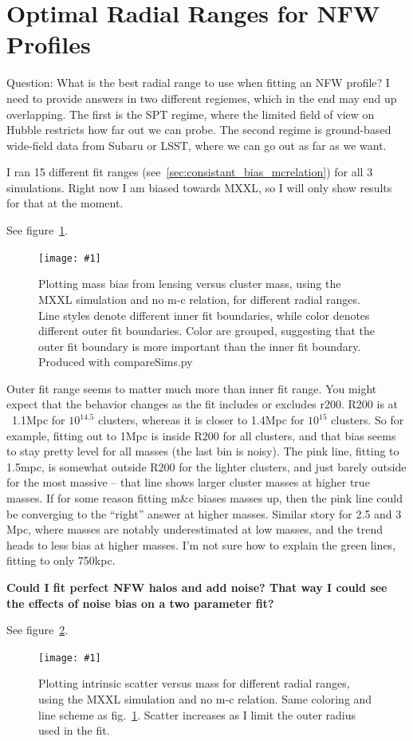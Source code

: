 \documentclass[11pt]{article}
\newcommand{\logfig}[2]{
See figure~\ref{fig:#1}.
\begin{figure}[!ht] 
\texttt{[image: \#1]} 
\caption{#2} 
\label{fig:#1} 
\end{figure}
}
\begin{document}
\section{Optimal Radial Ranges for NFW Profiles}

Question: What is the best radial range to use when fitting an NFW profile? I need to provide answers in two different regiemes, which in the end may end up overlapping. The first is the SPT regime, where the limited field of view on Hubble restricts how far out we can probe. The second regime is ground-based wide-field data from Subaru or LSST, where we can go out as far as we want.

I ran 15 different fit ranges (see~\ref{sec:consistant_bias_mcrelation}) for all 3 simulations. Right now I am biased towards MXXL, so I will only show results for that at the moment.

\logfig{figures/cfree}{Plotting mass bias from lensing versus cluster mass, using the MXXL simulation and no m-c relation, for different radial ranges. Line styles denote different inner fit boundaries, while color denotes different outer fit boundaries. Color are grouped, suggesting that the outer fit boundary is more important than the inner fit boundary. Produced with compareSims.py}

Outer fit range seems to matter much more than inner fit range. You might expect that the behavior changes as the fit includes or excludes r200. R200 is at ~1.1Mpc for $10^{14.5}$ clusters, whereas it is closer to 1.4Mpc for $10^{15}$ clusters. So for example, fitting out to 1Mpc is inside R200 for all clusters, and that bias seems to stay pretty level for all masses (the last bin is noisy). The pink line, fitting to 1.5mpc, is somewhat outside R200 for the lighter clusters, and just barely outside for the most massive -- that line shows larger cluster masses at higher true masses. If for some reason fitting m\&c biases masses up, then the pink line could be converging to the ``right'' answer at higher masses. Similar story for 2.5 and 3 Mpc, where masses are notably underestimated at low masses, and the trend heads to less bias at higher masses. I'm not sure how to explain the green lines, fitting to only 750kpc. 


\textbf{Could I fit perfect NFW halos and add noise? That way I could see the effects of noise bias on a two parameter fit?}


\logfig{figures/cfree_scatter}{Plotting intrinsic scatter versus mass for different radial ranges, using the MXXL simulation and no m-c relation. Same coloring and line scheme as fig.~\ref{fig:figures/cfree}. Scatter increases as I limit the outer radius used in the fit.}
\end{document}
